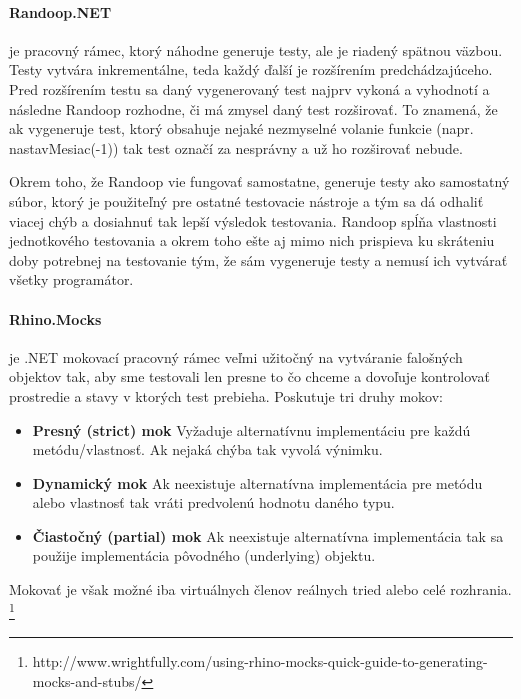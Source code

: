 \documentclass[11pt,twoside,slovak,a4paper]{article}
\begin{document}
		\paragraph{Randoop.NET} je pracovný rámec, ktorý náhodne generuje testy, ale je riadený spätnou väzbou. Testy vytvára inkrementálne, teda každý ďalší je rozšírením predchádzajúceho. Pred rozšírením testu sa daný vygenerovaný test najprv vykoná a vyhodnotí a následne Randoop rozhodne, či má zmysel daný test rozširovať. To znamená, že ak vygeneruje test, ktorý obsahuje nejaké nezmyselné volanie funkcie (napr. nastavMesiac(-1)) tak test označí za nesprávny a už ho rozširovať nebude.
		
		Okrem toho, že Randoop vie fungovať samostatne, generuje testy ako samostatný súbor, ktorý je použiteľný pre ostatné testovacie nástroje a tým sa dá odhaliť viacej chýb a dosiahnuť tak lepší výsledok testovania.\cite{Pacheco2007}
		Randoop spĺňa vlastnosti jednotkového testovania a okrem toho ešte aj mimo nich prispieva ku skráteniu doby potrebnej na testovanie tým, že sám vygeneruje testy a nemusí ich vytvárať všetky programátor.
		
		\paragraph{Rhino.Mocks} je .NET mokovací pracovný rámec veľmi užitočný na vytváranie falošných objektov tak, aby sme testovali len presne to čo chceme a dovoľuje kontrolovať prostredie a stavy v ktorých test prebieha.
		Poskutuje tri druhy mokov:
		\begin{itemize}
			\item \textbf{Presný (strict) mok} Vyžaduje alternatívnu implementáciu pre každú metódu/vlastnosť. Ak nejaká chýba tak vyvolá výnimku.
			\item \textbf{Dynamický mok} Ak neexistuje alternatívna implementácia pre metódu alebo vlastnosť tak vráti predvolenú hodnotu daného typu.
			\item \textbf{Čiastočný (partial) mok} Ak neexistuje alternatívna implementácia tak sa použije implementácia pôvodného (underlying) objektu.
		\end{itemize}
		Mokovať je však možné iba virtuálnych členov reálnych tried alebo celé rozhrania. \footnote{http://www.wrightfully.com/using-rhino-mocks-quick-guide-to-generating-mocks-and-stubs/}
		
\end{document}
